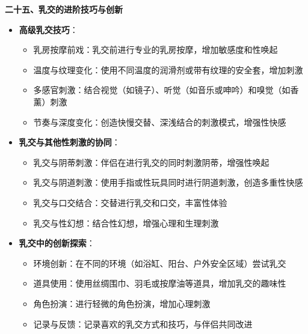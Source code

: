 \documentclass[12pt,UTF8]{ctexbook}
\begin{document}
  \textbf{二十五、乳交的进阶技巧与创新}
  \begin{itemize}
  \item \textbf{高级乳交技巧}：
    \begin{itemize}
    \item 乳房按摩前戏：乳交前进行专业的乳房按摩，增加敏感度和性唤起
    \item 温度与纹理变化：使用不同温度的润滑剂或带有纹理的安全套，增加刺激
    \item 多感官刺激：结合视觉（如镜子）、听觉（如音乐或呻吟）和嗅觉（如香薰）刺激
    \item 节奏与深度变化：创造快慢交替、深浅结合的刺激模式，增强性快感
    \end{itemize}
  \item \textbf{乳交与其他性刺激的协同}：
    \begin{itemize}
    \item 乳交与阴蒂刺激：伴侣在进行乳交的同时刺激阴蒂，增强性唤起
    \item 乳交与阴道刺激：使用手指或性玩具同时进行阴道刺激，创造多重性快感
    \item 乳交与口交结合：交替进行乳交和口交，丰富性体验
    \item 乳交与性幻想：结合性幻想，增强心理和生理刺激
    \end{itemize}
  \item \textbf{乳交中的创新探索}：
    \begin{itemize}
    \item 环境创新：在不同的环境（如浴缸、阳台、户外安全区域）尝试乳交
    \item 道具使用：使用丝绸围巾、羽毛或按摩油等道具，增加乳交的趣味性
    \item 角色扮演：进行轻微的角色扮演，增加心理刺激
    \item 记录与反馈：记录喜欢的乳交方式和技巧，与伴侣共同改进
    \end{itemize}
  \end{itemize}
\end{document}
